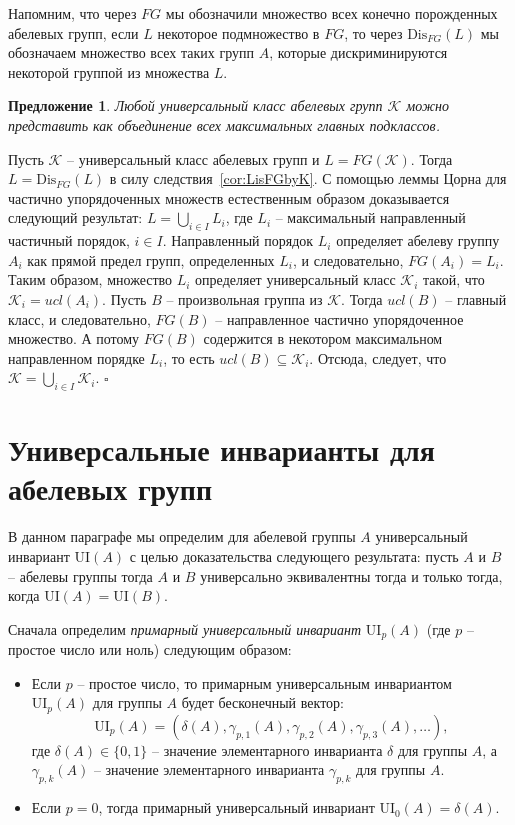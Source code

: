 \documentclass[a4paper,11pt,twoside]{article}
\newtheorem{proposition}{Предложение}[section]
\def\proof{{\noindent{\bf Доказательство.}} }
\def\K{{\mathcal{K}}}
\def\ui{{\mathrm{UI}}}
\def\Dis{{\mathrm{Dis}}}
\begin{document}
Напомним, что через $FG$ мы обозначили множество всех конечно порожденных абелевых групп, если $L$ некоторое подмножество в $FG$, то через $\Dis_{FG}(L)$ мы обозначаем множество всех таких групп $A$, которые дискриминируются некоторой группой из множества $L$.


\begin{proposition}\label{prop:AnyClassIsUnionOfMainClasses}
Любой универсальный класс абелевых групп $\K$ можно представить как объединение всех максимальных главных подклассов.
\end{proposition}

\proof Пусть $\K$ -- универсальный класс абелевых групп и $L = FG(\K)$. Тогда $L = \Dis_{FG}(L)$ в силу следствия~\ref{cor:LisFGbyK}. С помощью леммы Цорна для частично упорядоченных множеств естественным образом доказывается следующий результат: $L = \bigcup\limits_{i \in I} L_i$, где $L_i$ -- максимальный направленный частичный порядок, $i \in I$. Направленный порядок $L_i$ определяет абелеву группу $A_i$ 
как прямой предел групп, определенных $L_i$, и следовательно, $FG(A_i) = L_i$. Таким образом, множество $L_i$ определяет универсальный класс $\K_i$ такой, что $\K_i = ucl(A_i)$. Пусть $B$ -- произвольная группа из $\K$. Тогда $ucl(B)$ -- главный класс, и следовательно, $FG(B)$ -- направленное частично упорядоченное множество. А потому $FG(B)$ содержится в некотором максимальном направленном порядке $L_i$, то есть $ucl(B) \subseteq \K_i$. Отсюда, следует, что $\K = \bigcup\limits_{i \in I} \K_i$. $\square$


\section{Универсальные инварианты для абелевых групп}

В данном параграфе мы определим для абелевой группы $A$ универсальный инвариант $\ui(A)$ с целью доказательства следующего результата: пусть $A$ и $B$ -- абелевы группы тогда $A$ и $B$ универсально эквивалентны тогда и только тогда, когда $\ui(A) = \ui(B)$.

Сначала определим \textit{примарный универсальный инвариант} $\ui_p(A)$ (где $p$ -- простое число или ноль) следующим образом: 
\begin{itemize}
\item Если $p$ -- простое число, то примарным универсальным инвариантом $\ui_p(A)$ для группы $A$ будет бесконечный вектор:
$$\ui_p(A) = (\delta(A), \gamma_{p,1}(A), \gamma_{p,2}(A), \gamma_{p,3}(A), \ldots),$$
где $\delta(A) \in \{0,1\}$ -- значение элементарного инварианта $\delta$ для группы $A$, а $\gamma_{p,k}(A)$ -- значение элементарного инварианта $\gamma_{p,k}$ для группы $A$.
\item Если $p = 0$, тогда примарный универсальный инвариант $\ui_0(A) = \delta(A)$.
\end{itemize}
\end{document}
